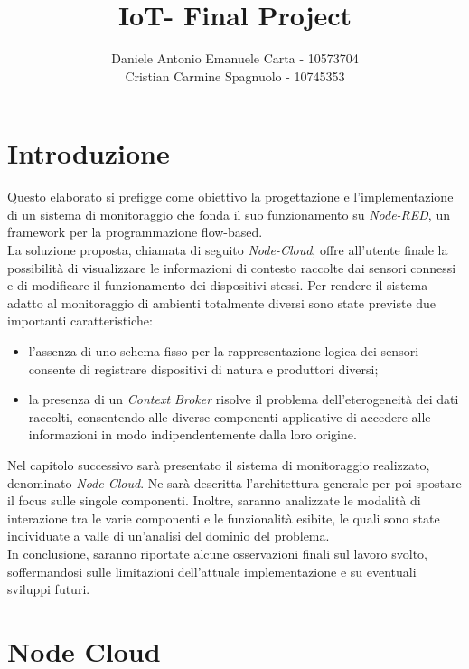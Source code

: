 \documentclass{article}
\title{{\huge IoT- Final Project}}
\author{Daniele Antonio Emanuele Carta - 10573704\\Cristian Carmine Spagnuolo - 10745353}
\begin{document}
\maketitle
\section{Introduzione}
Questo elaborato si prefigge come obiettivo la progettazione e l’implementazione di un sistema di monitoraggio che fonda il suo funzionamento su \emph{Node-RED}, un framework per la programmazione flow-based.\\

La soluzione proposta, chiamata di seguito \emph{Node-Cloud}, offre all’utente finale la possibilità di visualizzare le informazioni di contesto raccolte dai sensori connessi e di modificare il funzionamento dei dispositivi stessi. Per rendere il sistema adatto al monitoraggio di ambienti totalmente diversi sono state previste due importanti caratteristiche:
\begin{itemize}
    \item l’assenza di uno schema fisso per la rappresentazione logica dei sensori consente di registrare dispositivi di natura e produttori diversi;
    \item la presenza di un \emph{Context Broker} risolve il problema dell’eterogeneità dei dati raccolti, consentendo alle diverse componenti applicative di accedere alle informazioni in modo indipendentemente dalla loro origine.
\end{itemize}

Nel capitolo successivo sarà presentato il sistema di monitoraggio realizzato, denominato \emph{Node Cloud}. Ne sarà descritta l’architettura generale per poi spostare il focus sulle singole componenti. Inoltre, saranno analizzate le modalità di interazione tra le varie componenti e le funzionalità esibite, le quali sono state individuate a valle di un’analisi del dominio del problema.\\

In conclusione, saranno riportate alcune osservazioni finali sul lavoro svolto, soffermandosi sulle limitazioni dell’attuale implementazione e su eventuali sviluppi futuri.

\section{Node Cloud}
\end{document}
